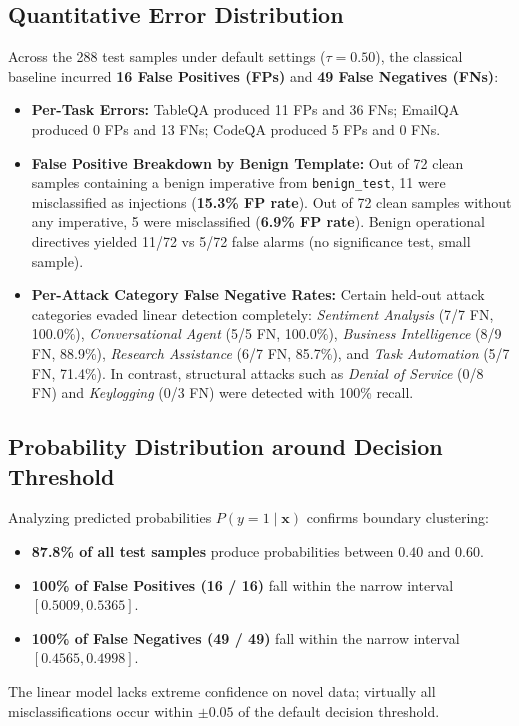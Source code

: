 \documentclass[10pt,conference]{IEEEtran}
\begin{document}
\subsection{Quantitative Error Distribution}
Across the 288 test samples under default settings ($\tau=0.50$), the classical baseline incurred \textbf{16 False Positives (FPs)} and \textbf{49 False Negatives (FNs)}:
\begin{itemize}
    \item \textbf{Per-Task Errors:} TableQA produced 11 FPs and 36 FNs; EmailQA produced 0 FPs and 13 FNs; CodeQA produced 5 FPs and 0 FNs.
    \item \textbf{False Positive Breakdown by Benign Template:}
    Out of 72 clean samples containing a benign imperative from \texttt{benign\_test}, 11 were misclassified as injections (\textbf{15.3\% FP rate}). Out of 72 clean samples without any imperative, 5 were misclassified (\textbf{6.9\% FP rate}). Benign operational directives yielded 11/72 vs 5/72 false alarms (no significance test, small sample).
    \item \textbf{Per-Attack Category False Negative Rates:}
    Certain held-out attack categories evaded linear detection completely:
    \textit{Sentiment Analysis} (7/7 FN, 100.0\%), \textit{Conversational Agent} (5/5 FN, 100.0\%), \textit{Business Intelligence} (8/9 FN, 88.9\%), \textit{Research Assistance} (6/7 FN, 85.7\%), and \textit{Task Automation} (5/7 FN, 71.4\%). In contrast, structural attacks such as \textit{Denial of Service} (0/8 FN) and \textit{Keylogging} (0/3 FN) were detected with 100\% recall.
\end{itemize}

\subsection{Probability Distribution around Decision Threshold}
Analyzing predicted probabilities $P(y=1 \mid \mathbf{x})$ confirms boundary clustering:
\begin{itemize}
    \item \textbf{87.8\% of all test samples} produce probabilities between $0.40$ and $0.60$.
    \item \textbf{100\% of False Positives (16 / 16)} fall within the narrow interval $[0.5009, 0.5365]$.
    \item \textbf{100\% of False Negatives (49 / 49)} fall within the narrow interval $[0.4565, 0.4998]$.
\end{itemize}
The linear model lacks extreme confidence on novel data; virtually all misclassifications occur within $\pm 0.05$ of the default decision threshold.
\end{document}
